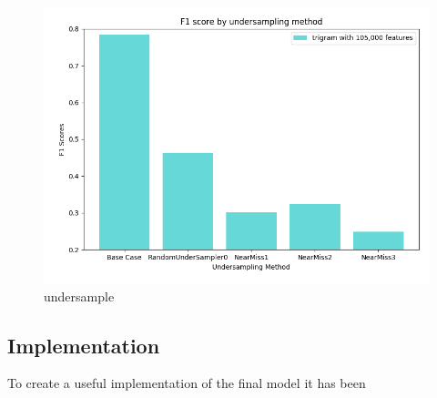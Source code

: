 \begin{figure}[h]
\caption{undersample}
\centering
\includegraphics[scale=0.5]{graphs/undersample.png}
\end{figure}



\subsection{Implementation}

To create a useful implementation of the final model it has been 


